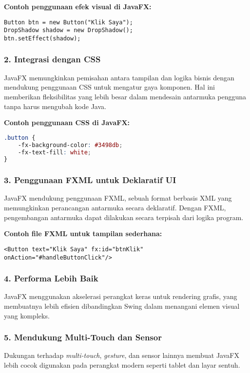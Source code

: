 \textbf{Contoh penggunaan efek visual di JavaFX:}
\begin{lstlisting}[style=JavaStyle, caption=Menambahkan efek bayangan pada sebuah tombol]
Button btn = new Button("Klik Saya");
DropShadow shadow = new DropShadow();
btn.setEffect(shadow);
\end{lstlisting}

\subsubsection{2. Integrasi dengan CSS}
JavaFX memungkinkan pemisahan antara tampilan dan logika bisnis dengan mendukung penggunaan CSS untuk mengatur gaya komponen. Hal ini memberikan fleksibilitas yang lebih besar dalam mendesain antarmuka pengguna tanpa harus mengubah kode Java.

\textbf{Contoh penggunaan CSS di JavaFX:}
\begin{lstlisting}[language=css, caption=Mengatur warna latar belakang tombol dengan CSS]
.button {
	-fx-background-color: #3498db;
	-fx-text-fill: white;
}
\end{lstlisting}

\subsubsection{3. Penggunaan FXML untuk Deklaratif UI}
JavaFX mendukung penggunaan FXML, sebuah format berbasis XML yang memungkinkan perancangan antarmuka secara deklaratif. Dengan FXML, pengembangan antarmuka dapat dilakukan secara terpisah dari logika program.

\textbf{Contoh file FXML untuk tampilan sederhana:}
\begin{lstlisting}[style=XmlStyle, caption=Contoh file FXML]
<Button text="Klik Saya" fx:id="btnKlik" onAction="#handleButtonClick"/>
\end{lstlisting}

\subsubsection{4. Performa Lebih Baik}
JavaFX menggunakan akselerasi perangkat keras untuk rendering grafis, yang membuatnya lebih efisien dibandingkan Swing dalam menangani elemen visual yang kompleks.

\subsubsection{5. Mendukung Multi-Touch dan Sensor}
Dukungan terhadap \textit{multi-touch}, \textit{gesture}, dan sensor lainnya membuat JavaFX lebih cocok digunakan pada perangkat modern seperti tablet dan layar sentuh.

